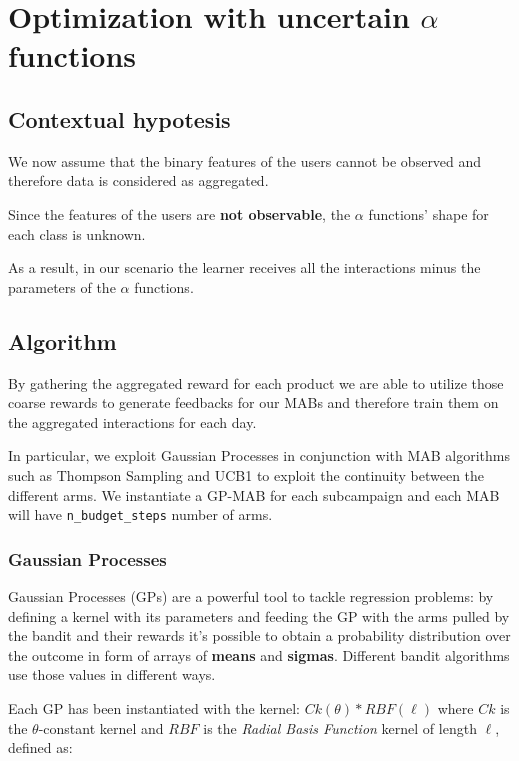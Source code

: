 \chapter{Optimization with uncertain \texorpdfstring{$\alpha$}{alpha} functions}
\label{chap:unc_alpha}

\section{Contextual hypotesis}
\label{sec:unc_a_hyp}

We now assume that the binary features of the users cannot be observed and therefore data is considered as aggregated.

Since the features of the users are \textbf{not observable}, the $\alpha$ functions' shape for each class is unknown.

As a result, in our scenario the learner receives all the interactions minus the parameters of the $\alpha$ functions.

\section{Algorithm}
\label{sec:unc_a_alg}

By gathering the aggregated reward for each product we are able to utilize those coarse rewards to generate feedbacks for our MABs and therefore train them on the aggregated interactions for each day.

In particular, we exploit Gaussian Processes in conjunction with MAB algorithms such as Thompson Sampling and UCB1 to exploit the continuity between the different arms.
We instantiate a GP-MAB for each subcampaign and each MAB will have \texttt{n\_budget\_steps} number of arms.

\subsection{Gaussian Processes}

Gaussian Processes (GPs) are a powerful tool to tackle regression problems: by defining a kernel with its parameters and feeding the GP with the arms pulled by the bandit and their rewards it's possible to obtain a probability distribution over the outcome in form of arrays of \textbf{means} and \textbf{sigmas}.
Different bandit algorithms use those values in different ways.

Each GP has been instantiated with the kernel: $Ck(\theta) * RBF(\ell)$ where $Ck$ is the $\theta$-constant kernel and $RBF$ is the \textit{Radial Basis Function} kernel of length $\ell$, defined as:

